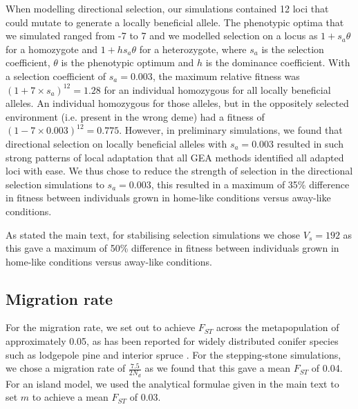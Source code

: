 \documentclass[10pt,twoside,lineno]{GSA_format}
\begin{document}
When modelling directional selection, our simulations contained 12 loci that could mutate to generate a locally beneficial allele. The phenotypic optima that we simulated ranged from -7 to 7 and we modelled selection on a locus as $1 + s_a\theta$ for a homozygote and $1 + hs_a\theta$ for a heterozygote, where $s_a$ is the selection coefficient, $\theta$ is the phenotypic optimum and $h$ is the dominance coefficient. With a selection coefficient of $s_a = 0.003$, the maximum relative fitness was $(1+7\times s_a)^{12} = 1.28$ for an individual homozygous for all locally beneficial alleles. An individual homozygous for those alleles, but in the oppositely selected environment (i.e. present in the wrong deme) had a fitness of $(1-7\times 0.003)^{12} = 0.775$. However, in preliminary simulations, we found that directional selection on locally beneficial alleles with $s_a = 0.003$ resulted in such strong patterns of local adaptation that all GEA methods identified all adapted loci with ease. We thus chose to reduce the strength of selection in the directional selection simulations to $s_a = 0.003$, this resulted in a maximum of 35\% difference in fitness between individuals grown in home-like conditions versus away-like conditions.

As stated the main text, for stabilising selection simulations we chose $V_s = 192$ as this gave a maximum of 50\% difference in fitness between individuals grown in home-like conditions versus away-like conditions.

\subsection{Migration rate} 
For the migration rate,  we set out to achieve $F_{ST}$ across the metapopulation of approximately 0.05, as has been reported for widely distributed conifer species such as lodgepole pine and interior spruce \citep{Yeaman2016}. For the stepping-stone simulations, we chose a migration rate of $\frac{7.5}{2N_d}$ as we found that this gave a mean $F_{ST}$ of 0.04. For an island model, we used the analytical formulae given in the main text to set $m$ to achieve a mean $F_{ST}$ of 0.03. 
\end{document}
